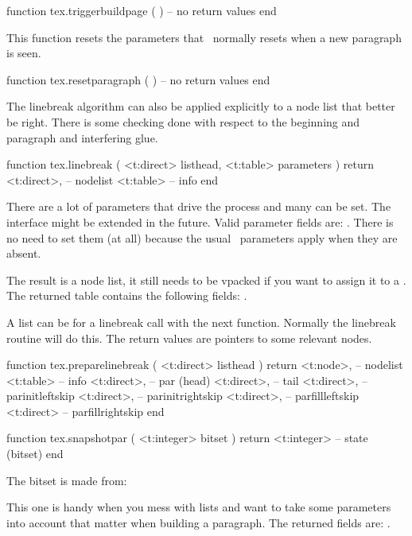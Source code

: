 \starttyping[option=LUA]
function tex.triggerbuildpage ( )
    -- no return values
end
\stoptyping

This function resets the parameters that \TEX\ normally resets when a new paragraph
is seen.

\starttyping[option=LUA]
function tex.resetparagraph ( )
    -- no return values
end
\stoptyping

The linebreak algorithm can also be applied explicitly to a node list that better
be right. There is some checking done with respect to the beginning and paragraph
and interfering glue.

\starttyping[option=LUA]
function tex.linebreak (
    <t:direct> listhead,
    <t:table>  parameters
)
    return
        <t:direct>, -- nodelist
        <t:table>   -- info
end
\stoptyping

There are a lot of parameters that drive the process and many can be set. The
interface might be extended in the future. Valid parameter fields are:
. There is no need to set
them (at all) because the usual \TEX\ parameters apply when they are absent.

The result is a node list, it still needs to be vpacked if you want to assign it
to a \type {\vbox}. The returned  table contains the following fields:
.

A list can be  for a linebreak call with the next function.
Normally the linebreak routine will do this. The return values are pointers to
some relevant nodes.

\starttyping[option=LUA]
function tex.preparelinebreak (
    <t:direct>  listhead
)
    return
        <t:node>, -- nodelist
        <t:table> -- info
        <t:direct>, -- par (head)
        <t:direct>, -- tail
        <t:direct>, -- parinitleftskip
        <t:direct>, -- parinitrightskip
        <t:direct>, -- parfillleftskip
        <t:direct>  -- parfillrightskip
end
\stoptyping

\starttyping[option=LUA]
function tex.snapshotpar ( <t:integer> bitset )
    return <t:integer> -- state (bitset)
end
\stoptyping

The bitset is made from:

\startthreerows
{}
\stopthreerows

This one is handy when you mess with lists and want to take some parameters
into account that matter when building a paragraph. The returned fields are:
.

